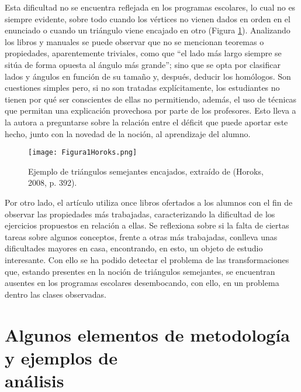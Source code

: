 	Esta dificultad no se encuentra reflejada en los programas escolares, lo cual no es siempre evidente, sobre todo cuando los vértices no vienen dados en orden en el enunciado o cuando un triángulo viene encajado en otro (Figura \ref{Figura1Horoks}). Analizando los libros y manuales se puede observar que no se mencionan teoremas o propiedades, aparentemente triviales, como que ``el lado más largo siempre se sitúa de forma opuesta al ángulo más grande''; sino que se opta por clasificar lados y ángulos en función de su tamaño y, después, deducir los homólogos. Son cuestiones simples pero, si no son tratadas explícitamente, los estudiantes no tienen por qué ser conscientes de ellas no permitiendo, además, el uso de técnicas que permitan una explicación provechosa por parte de los profesores. Esto lleva a la autora a preguntarse sobre la relación entre el déficit que puede aportar este hecho, junto con la novedad de la noción, al aprendizaje del alumno.
	
	\begin{figure}[h!]
		\centering
		\texttt{[image: Figura1Horoks.png]}
		\caption{Ejemplo  de triángulos semejantes encajados, extraído de (Horoks, 2008, p. 392).}
		\label{Figura1Horoks}
	\end{figure}
	
	Por otro lado, el artículo utiliza once libros ofertados a los alumnos con el fin de observar las propiedades más trabajadas, caracterizando la dificultad de los ejercicios propuestos en relación a ellas. Se reflexiona sobre si la falta de ciertas tareas sobre algunos conceptos, frente a otras más trabajadas, conlleva unas dificultades mayores en casa, encontrando, en esto, un objeto de estudio interesante. Con ello se ha podido detectar el problema de las transformaciones que, estando presentes en la noción de triángulos semejantes, se encuentran ausentes en los programas escolares desembocando, con ello, en un problema dentro las clases observadas.
	

\section*{Algunos elementos de metodología y ejemplos de\\ \mbox{análisis}}

